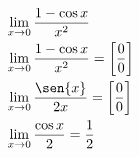 \begin{ex}
\begin{align}
&\lim_{x\rightarrow 0} \frac{1-\cos{x}}{x^2}\nonumber\\
&\lim_{x\rightarrow 0} \frac{1-\cos{x}}{x^2}=\left[\frac{0}{0}\right]\nonumber\\
&\lim_{x\rightarrow 0} \frac{\sen{x}}{2x}=\left[\frac{0}{0}\right]\nonumber\\
&\lim_{x\rightarrow 0} \frac{\cos{x}}{2}=\frac{1}{2}\nonumber
\end{align}
\end{ex}
